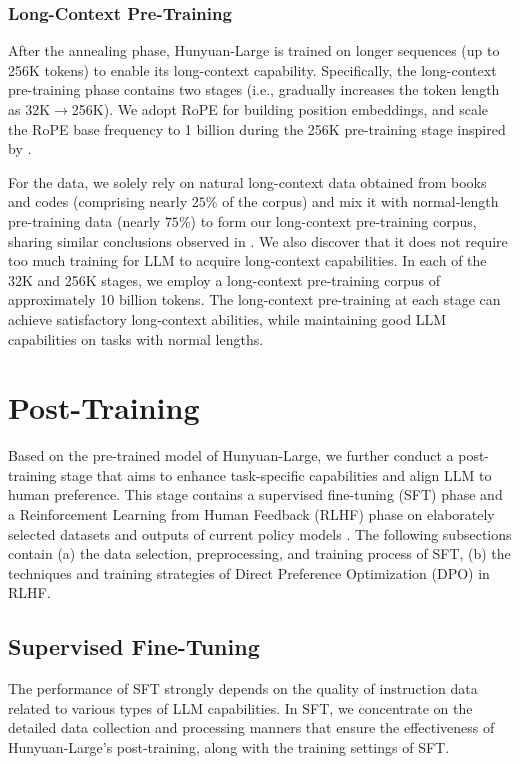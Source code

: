 \documentclass{article}
\begin{document}
\subsubsection{Long-Context Pre-Training}
After the annealing phase, Hunyuan-Large is trained on longer sequences (up to 256K tokens) to enable its long-context capability. Specifically, the long-context pre-training phase contains two stages (i.e., gradually increases the token length as 32K$\rightarrow$256K). We adopt RoPE \citep{su2024roformer} for building position embeddings, and scale the RoPE base frequency to 1 billion during the 256K pre-training stage inspired by \cite{xiong2023effective}.

For the data, we solely rely on natural long-context data obtained from books and codes (comprising nearly $25\%$ of the corpus) and mix it with normal-length pre-training data (nearly $75\%$) to form our long-context pre-training corpus, sharing similar conclusions observed in \cite{gao2024train}. We also discover that it does not require too much training for LLM to acquire long-context capabilities. In each of the 32K and 256K stages, we employ a long-context pre-training corpus of approximately 10 billion tokens. The long-context pre-training at each stage can achieve satisfactory long-context abilities, while maintaining good LLM capabilities on tasks with normal lengths.

\section{Post-Training}
\label{sec:post-training}
Based on the pre-trained model of Hunyuan-Large, we further conduct a post-training stage that aims to enhance task-specific capabilities and align LLM to human preference. This stage contains a supervised fine-tuning (SFT) phase and a Reinforcement Learning from Human Feedback (RLHF) phase on elaborately selected datasets and outputs of current policy models \citep{bai2022training}. The following subsections contain (a) the data selection, preprocessing, and training process of SFT, (b) the techniques and training strategies of Direct Preference Optimization (DPO) in RLHF.

\subsection{Supervised Fine-Tuning}
The performance of SFT strongly depends on the quality of instruction data related to various types of LLM capabilities. In SFT, we concentrate on the detailed data collection and processing manners that ensure the effectiveness of Hunyuan-Large's post-training, along with the training settings of SFT.
\end{document}
